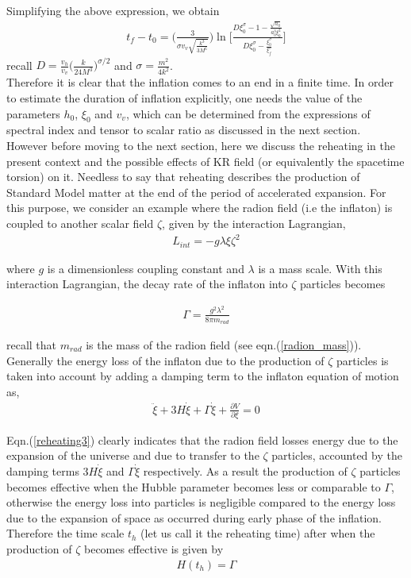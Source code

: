 \documentclass[a4paper]{article}
\begin{document}
Simplifying the above expression, we obtain
\begin{eqnarray}
 t_f-t_0 = \bigg(\frac{3}{\sigma v_v\sqrt{\frac{k^3}{3M^6}}}\bigg)
 \ln\bigg[\frac{D\xi_0^{\sigma} - 1 - \frac{\sqrt{h_0}}{a_0^3\xi_0^2}}
 {D\xi_0^{\sigma} - \frac{\xi_0^{\sigma}}{\xi_f^{\sigma}}}\bigg]
 \label{duration}
\end{eqnarray}
recall $D = \frac{v_h}{v_v}\big(\frac{k}{24M^3}\big)^{\sigma/2}$ and $\sigma = \frac{m^2}{4k^2}$.\\
Therefore it is clear that the inflation comes to an end in a finite time. In order to estimate the duration of inflation explicitly, one needs the 
value of the parameters $h_0$, $\xi_0$ and $v_v$, which can be determined from the expressions of spectral index and tensor to scalar ratio as 
discussed in the next section.\\
However before moving to the next section, here we discuss the reheating in the present context and the possible effects 
of KR field (or equivalently the spacetime torsion) on it. 
Needless to say that reheating describes the production of Standard Model matter at the end of the period of accelerated expansion. For 
this purpose, we consider an example where the radion field (i.e the inflaton) is coupled to another scalar field $\zeta$, 
given by the interaction Lagrangian,
\begin{eqnarray}
 L_{int} = -g\lambda \xi\zeta^2
 \label{reheating1}
\end{eqnarray}

where $g$ is a dimensionless coupling constant and $\lambda$ is a mass scale. With this interaction Lagrangian, the decay rate of the inflaton into 
$\zeta$ particles becomes

\begin{eqnarray}
 \Gamma = \frac{g^2\lambda^2}{8\pi m_{rad}}
 \label{reheating2}
\end{eqnarray}

recall that $m_{rad}$ is the mass of the radion field (see eqn.(\ref{radion_mass})). 
Generally the energy loss of the inflaton due to the production of $\zeta$ particles is taken into 
account by adding a damping term to the inflaton equation of motion as,
\begin{eqnarray}
 \ddot{\xi} + 3H\dot{\xi} + \Gamma \dot{\xi} + \frac{\partial V}{\partial\xi} = 0
 \label{reheating3}
\end{eqnarray}

Eqn.(\ref{reheating3}) clearly indicates that the radion field losses energy due to the expansion of the universe and due to transfer to 
the $\zeta$ particles, accounted by the damping terms $3H\dot{\xi}$ and $\Gamma \dot{\xi}$ respectively. As a result the production of $\zeta$ particles 
becomes effective when the Hubble parameter becomes less or comparable to $\Gamma$, otherwise the energy loss into particles is negligible 
compared to the energy loss due to the expansion of space as occurred during early phase of the inflation. Therefore the time scale $t_h$ (let 
us call it the reheating time) after when the production of $\zeta$ becomes effective is given by
\begin{eqnarray}
 H(t_h) = \Gamma
 \label{reheating4}
\end{eqnarray}
\end{document}

